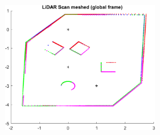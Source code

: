 \begin{solution}
\begin{center}
        \includegraphics[width=0.5\textwidth]{img/e4comb.png}
    \end{center}
\end{solution}